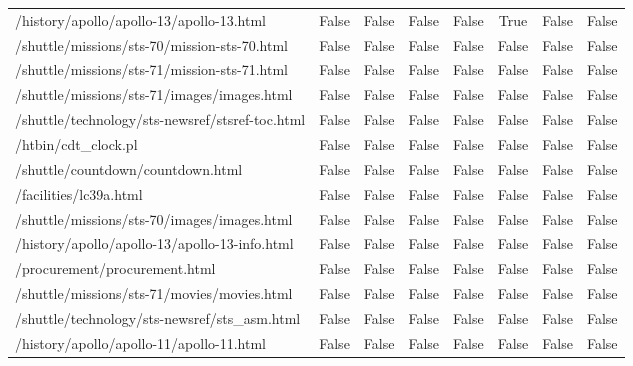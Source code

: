 \documentclass[../EDI_Task1_Karwowski_Kowalewski.tex]{subfiles}
\begin{document}
{{{\begin{table}[!htbp]
\begin{tabular}{|l|c|c|c|c|c|c|c|}
                    /history/apollo/apollo-13/apollo-13.html         &      False   &   False   &   False   &   False   &    True   &   False   &   False \\
                    /shuttle/missions/sts-70/mission-sts-70.html     &      False   &   False   &   False   &   False   &   False   &   False   &   False \\
                    /shuttle/missions/sts-71/mission-sts-71.html     &      False   &   False   &   False   &   False   &   False   &   False   &   False \\
                    /shuttle/missions/sts-71/images/images.html      &      False   &   False   &   False   &   False   &   False   &   False   &   False \\
                    /shuttle/technology/sts-newsref/stsref-toc.html  &      False   &   False   &   False   &   False   &   False   &   False   &   False \\
                    /htbin/cdt\_clock.pl                              &      False   &   False   &   False   &   False   &   False   &   False   &   False \\
                    /shuttle/countdown/countdown.html                &      False   &   False   &   False   &   False   &   False   &   False   &   False \\
                    /facilities/lc39a.html                           &      False   &   False   &   False   &   False   &   False   &   False   &   False \\
                    /shuttle/missions/sts-70/images/images.html      &      False   &   False   &   False   &   False   &   False   &   False   &   False \\
                    /history/apollo/apollo-13/apollo-13-info.html    &      False   &   False   &   False   &   False   &   False   &   False   &   False \\
                    /procurement/procurement.html                    &      False   &   False   &   False   &   False   &   False   &   False   &   False \\
                    /shuttle/missions/sts-71/movies/movies.html      &      False   &   False   &   False   &   False   &   False   &   False   &   False \\
                    /shuttle/technology/sts-newsref/sts\_asm.html     &      False   &   False   &   False   &   False   &   False   &   False   &   False \\
                    /history/apollo/apollo-11/apollo-11.html         &      False   &   False   &   False   &   False   &   False   &   False   &   False \\

\end{tabular}
\end{table}}}}
\end{document}
